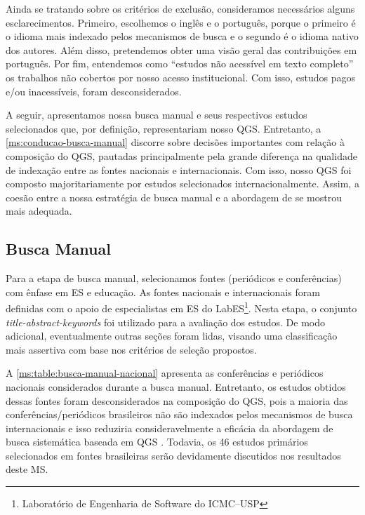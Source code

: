 Ainda se tratando sobre os critérios de exclusão, consideramos necessários alguns esclarecimentos. Primeiro, escolhemos o inglês e o português, porque o primeiro é o idioma mais indexado pelos mecanismos de busca e o segundo é o idioma nativo dos autores. Além disso, pretendemos obter uma visão geral das contribuições em português. Por fim, entendemos como ``estudos não acessível em texto completo'' os trabalhos não cobertos por nosso acesso institucional. Com isso, estudos pagos e/ou inacessíveis, foram desconsiderados.

A seguir, apresentamos nossa busca manual e seus respectivos estudos selecionados que, por definição, representariam nosso QGS. Entretanto, a \autoref{ms:conducao-busca-manual} discorre sobre decisões importantes com relação à composição do QGS, pautadas principalmente pela grande diferença na qualidade de indexação entre as fontes nacionais e internacionais. Com isso, nosso QGS foi composto majoritariamente por estudos selecionados internacionalmente. Assim, a coesão entre a nossa estratégia de busca manual e a abordagem de  se mostrou mais adequada.

\subsection{Busca Manual}
\label{ms:conducao-busca-manual}

Para a etapa de busca manual, selecionamos fontes (periódicos e conferências) com ênfase em ES e educação. As fontes nacionais e internacionais foram definidas com o apoio de especialistas em ES do LabES\footnote{Laboratório de Engenharia de Software do ICMC--USP}. Nesta etapa, o conjunto \textit{title-abstract-keywords} foi utilizado para a avaliação dos estudos. De modo adicional, eventualmente outras seções foram lidas, visando uma classificação mais assertiva com base nos critérios de seleção propostos.

A \autoref{ms:table:busca-manual-nacional} apresenta as conferências e periódicos nacionais considerados durante a busca manual. Entretanto, os estudos obtidos dessas fontes foram desconsiderados na composição do QGS, pois a maioria das conferências/periódicos brasileiros não são indexados pelos mecanismos de busca internacionais e isso reduziria consideravelmente a eficácia da abordagem de busca sistemática baseada em QGS \cite{Zhang2011}. Todavia, os 46 estudos primários selecionados em fontes brasileiras serão devidamente discutidos nos resultados deste MS. 

